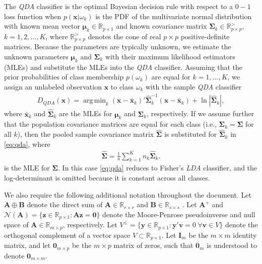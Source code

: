 \documentclass[11pt]{article}
\newcommand{\xbar}{\bar{\bm x}}
\DeclareMathOperator*{\argmin}{arg\,min}
\begin{document}
The \emph{QDA} classifier is the optimal Bayesian decision rule with respect to a $0-1$ loss function when $p(\bm x | \omega_k)$ is the PDF of the multivariate normal distribution with known mean vector  $\bm\mu_k \in \mathbb{R}_{p \times 1}$ and known covariance matrix $\bm\Sigma_k \in \mathbb{R}_{p \times p}^{>}$, $k = 1, 2, \ldots, K$, where $\mathbb{R}_{p \times p}^{>}$ denotes the cone of real $p \times p$ positive-definite matrices. Because the parameters are typically unknown, we estimate the unknown parameters $\bm \mu_k$ and $\bm\Sigma_k$ with their maximum likelihood estimators (MLEs) and substitute the MLEs into the \emph{QDA} classifier. Assuming that the prior probabilities of class membership $p(\omega_k)$ are equal for $k = 1, \ldots, K$, we assign an unlabeled observation $\bm x$ to class $\omega_k$ with the sample \emph{QDA} classifier
\begin{align}
	D_{QDA}(\bm x) = \argmin_{k}  (\bm x - \xbar_k)'\widehat{\bm\Sigma}_k^{-1}(\bm x - \xbar_k)  + \ln |\widehat{\bm\Sigma}_k|, \label{eq:qda}
\end{align}
where $\xbar_k$ and $\widehat{\bm\Sigma}_k$ are the MLEs for $\bm \mu_k$ and $\bm \Sigma_k$, respectively. If we assume further that the population covariance matrices are equal for each class (i.e., $\bm\Sigma_k = \bm\Sigma$ for all $k$), then the pooled sample covariance matrix $\widehat{\bm\Sigma}$ is substituted for $\widehat{\bm \Sigma}_k$ in \eqref{eq:qda}, where
\begin{align}
	\widehat{\bm\Sigma} = \frac{1}{n} \sum_{k=1}^K n_k \widehat{\bm\Sigma}_k. \label{eq:pooled-cov}
\end{align}
is the MLE for $\bm \Sigma$. In this case \eqref{eq:qda} reduces to Fisher's \emph{LDA} classifier, and the log-determinant is omitted because it is constant across all classes.

We also require the following additional notation throughout the document. Let $\bm A \oplus \bm B$ denote the direct sum of $\bm A \in \mathbb{R}_{r \times r}$ and $\bm B \in \mathbb{R}_{s \times s}$ \citep[Chapter 1]{Lutkepohl:1996uz}. Let $\bm A^+$ and $\mathcal{N}(\bm A) = \{\bm z \in \mathbb{R}_{p \times 1} : \bm A \bm z = \bm 0\}$ denote the Moore-Penrose pseudoinverse and null space of $\bm A \in \mathbb{R}_{m \times p}$, respectively. Let $V^{\perp} = \{\bm y \in \mathbb{R}_{p \times 1} : \bm y'\bm v = 0\ \forall \bm v \in V \}$ denote the orthogonal complement of a vector space $V \subset \mathbb{R}_{p \times 1}$. Let $\bm I_m$ be the $m \times m$ identity matrix, and let $\bm 0_{m \times p}$ be the $m \times p$ matrix of zeros, such that $\bm 0_m$ is understood to denote $\bm 0_{m \times m}$.
\end{document}
